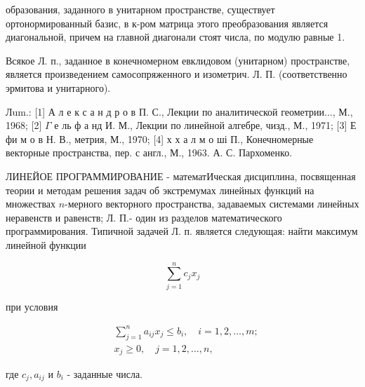 \documentclass[10pt]{article}
\begin{document}
образования, заданного в унитарном пространстве, существует ортонормированный базис, в к-ром матрица этого преобразования является диагональной, причем на главной диагонали стоят числа, по модулю равные 1.



Всякое Л. п., заданное в конечномерном евклидовом (унитарном) пространстве, является произведением самосопряженного и изометрич. Л. П. (соответственно эрмитова и унитарного).



Лum.: [1] А л е к с а н д р о в П. С., Лекции по аналитической геометрии..., М., 1968; [2] $\Gamma$ е ль ф а нд И. М., Лекции по линейной алгебре, чизд., М., 1971; [3] Е фи м о в Н. В., метрия, М., 1970; [4] х х а л м о ші П., Конечномерные векторные пространства, пер. с англ., М., 1963. А. С. Пархоменко.



ЛИНЕЙОЕ ПРОГРАММИРОВАНИЕ - математИческая дисциплина, посвященная теории и методам решения задач об экстремумах линейных функций на множествах $n$-мерного векторного пространства, задаваемых системами линейных неравенств и равенств; Л. П.- один из разделов математического программирования. Типичной задачей Л. п. является следующая: найти максимум линейной функции



\[

\sum_{j=1}^{n} c_{j} x_{j}

\]



при условия



\[

\begin{aligned}

& \sum_{j=1}^{n} a_{i j} x_{j} \leqslant b_{i}, \quad i=1,2, \ldots, m ; \\

& x_{j} \geqslant 0, \quad j=1,2, \ldots, n,

\end{aligned}

\]



где $c_{j}, a_{i j}$ и $b_{i}$ - заданные числа.
\end{document}
